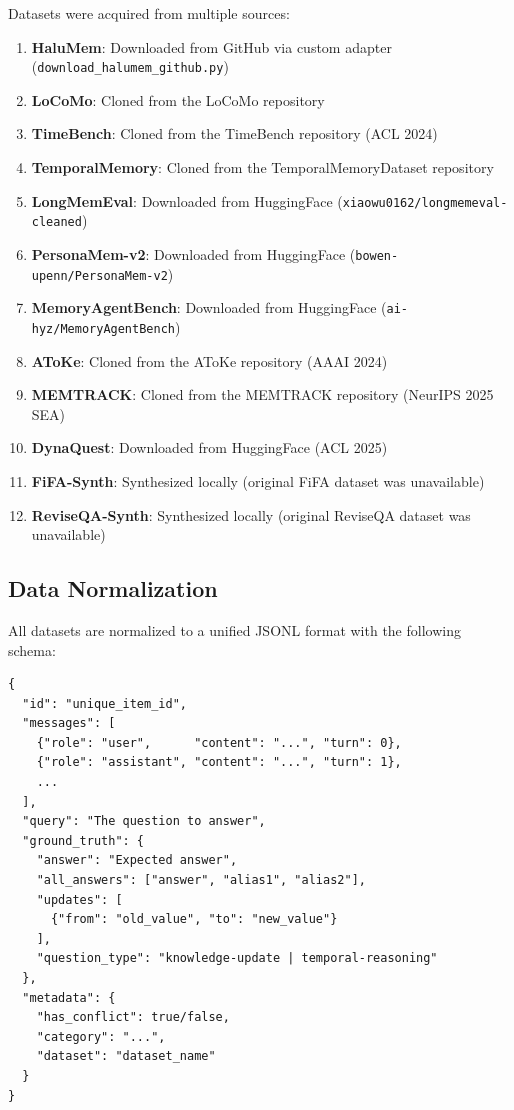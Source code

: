 \documentclass[11pt,a4paper]{article}
\begin{document}
Datasets were acquired from multiple sources:

\begin{enumerate}
    \item \textbf{HaluMem}: Downloaded from GitHub via custom adapter (\texttt{download\_halumem\_github.py})
    \item \textbf{LoCoMo}: Cloned from the LoCoMo repository
    \item \textbf{TimeBench}: Cloned from the TimeBench repository (ACL 2024)
    \item \textbf{TemporalMemory}: Cloned from the TemporalMemoryDataset repository
    \item \textbf{LongMemEval}: Downloaded from HuggingFace (\texttt{xiaowu0162/longmemeval-cleaned})
    \item \textbf{PersonaMem-v2}: Downloaded from HuggingFace (\texttt{bowen-upenn/PersonaMem-v2})
    \item \textbf{MemoryAgentBench}: Downloaded from HuggingFace (\texttt{ai-hyz/MemoryAgentBench})
    \item \textbf{AToKe}: Cloned from the AToKe repository (AAAI 2024)
    \item \textbf{MEMTRACK}: Cloned from the MEMTRACK repository (NeurIPS 2025 SEA)
    \item \textbf{DynaQuest}: Downloaded from HuggingFace (ACL 2025)
    \item \textbf{FiFA-Synth}: Synthesized locally (original FiFA dataset was unavailable)
    \item \textbf{ReviseQA-Synth}: Synthesized locally (original ReviseQA dataset was unavailable)
\end{enumerate}

\subsection{Data Normalization}

All datasets are normalized to a unified JSONL format with the following schema:

\begin{lstlisting}[language={},frame=single]
{
  "id": "unique_item_id",
  "messages": [
    {"role": "user",      "content": "...", "turn": 0},
    {"role": "assistant", "content": "...", "turn": 1},
    ...
  ],
  "query": "The question to answer",
  "ground_truth": {
    "answer": "Expected answer",
    "all_answers": ["answer", "alias1", "alias2"],
    "updates": [
      {"from": "old_value", "to": "new_value"}
    ],
    "question_type": "knowledge-update | temporal-reasoning"
  },
  "metadata": {
    "has_conflict": true/false,
    "category": "...",
    "dataset": "dataset_name"
  }
}
\end{lstlisting}
\end{document}
